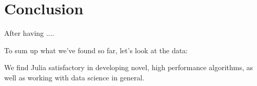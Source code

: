 \section{Conclusion}

After having ....

To sum up what we've found so far, let's look at the data: 

We find Julia satisfactory in developing novel, high performance algorithms, as well as working with data science in general.